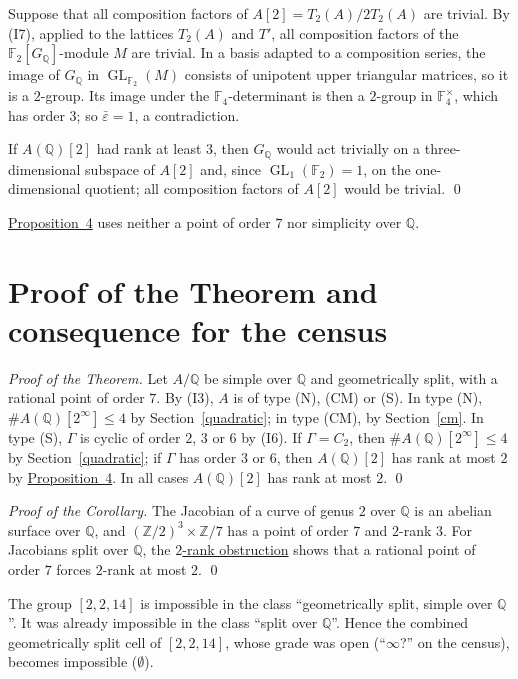 \documentclass[11pt]{article}
\newcommand{\Q}{\mathbb Q}
\newcommand{\Z}{\mathbb Z}
\newcommand{\F}{\mathbb F}
\DeclareMathOperator{\GL}{GL}
\begin{document}
Suppose that all composition factors of \(A[2]=T_2(A)/2T_2(A)\) are trivial. By (I7), applied to
the lattices \(T_2(A)\) and \(T'\), all composition factors of the \(\F_2[G_{\Q}]\)-module \(M\)
are trivial. In a basis adapted to a composition series, the image of \(G_{\Q}\) in
\(\GL_{\F_2}(M)\) consists of unipotent upper triangular matrices, so it is a \(2\)-group. Its
image under the \(\F_4\)-determinant is then a \(2\)-group in \(\F_4^\times\), which has order
\(3\); so \(\bar\varepsilon=1\), a contradiction.

If \(A(\Q)[2]\) had rank at least \(3\), then \(G_{\Q}\) would act trivially on a
three-dimensional subspace of \(A[2]\) and, since \(\GL_1(\F_2)=1\), on the one-dimensional
quotient; all composition factors of \(A[2]\) would be trivial. \qed

\medskip
\hyperref[prop-cyclic]{Proposition~4} uses neither a point of order \(7\) nor simplicity over
\(\Q\).

\section{Proof of the Theorem and consequence for the census}\label{census}

\emph{Proof of the Theorem.} Let \(A/\Q\) be simple over \(\Q\) and geometrically split, with a
rational point of order \(7\). By (I3), \(A\) is of type (N), (CM) or (S). In type (N),
\(\#A(\Q)[2^\infty]\le4\) by Section~\ref{quadratic}; in type (CM), by Section~\ref{cm}. In type
(S), \(\Gamma\) is cyclic of order \(2\), \(3\) or \(6\) by (I6). If \(\Gamma=C_2\), then
\(\#A(\Q)[2^\infty]\le4\) by Section~\ref{quadratic}; if \(\Gamma\) has order \(3\) or \(6\), then
\(A(\Q)[2]\) has rank at most \(2\) by \hyperref[prop-cyclic]{Proposition~4}. In all cases
\(A(\Q)[2]\) has rank at most \(2\). \qed

\medskip
\emph{Proof of the Corollary.} The Jacobian of a curve of genus \(2\) over \(\Q\) is an abelian
surface over \(\Q\), and \((\Z/2)^3\times\Z/7\) has a point of order \(7\) and \(2\)-rank \(3\).
For Jacobians split over \(\Q\), the
\href{https://genus-2-torsion.github.io/proofs/qsplit-two-rank-obstruction.html}{\(2\)-rank
obstruction} shows that a rational point of order \(7\) forces \(2\)-rank at most \(2\). \qed

\medskip
The group \href{https://genus-2-torsion.github.io/group.html?g=2.2.14}{\([2,2,14]\)} is impossible
in the class ``geometrically split, simple over \(\Q\)''. It was already impossible in the class
``split over \(\Q\)''. Hence the combined geometrically split cell of
\([2,2,14]\), whose grade was open (``\(\infty\)?'' on the census), becomes impossible
(\(\emptyset\)).
\end{document}
